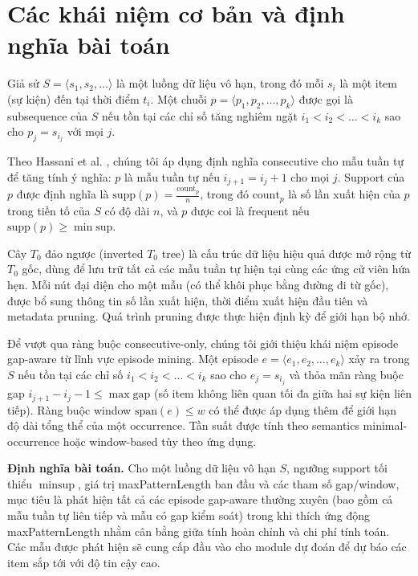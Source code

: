 \documentclass{article}
\begin{document}
\section{Các khái niệm cơ bản và định nghĩa bài toán}
\label{sec:preliminaries}

Giả sử $S = \langle s_1, s_2, \dots \rangle$ là một luồng dữ liệu vô hạn, trong đó mỗi $s_i$ là một item (sự kiện) đến tại thời điểm $t_i$. Một chuỗi $p = \langle p_1, p_2, \dots, p_k \rangle$ được gọi là subsequence của $S$ nếu tồn tại các chỉ số tăng nghiêm ngặt $i_1 < i_2 < \dots < i_k$ sao cho $p_j = s_{i_j}$ với mọi $j$.

Theo Hassani et al. \cite{hassani2019}, chúng tôi áp dụng định nghĩa consecutive cho mẫu tuần tự để tăng tính ý nghĩa: $p$ là mẫu tuần tự nếu $i_{j+1} = i_j + 1$ cho mọi $j$. Support của $p$ được định nghĩa là $\text{supp}(p) = \frac{\text{count}_p}{n}$, trong đó $\text{count}_p$ là số lần xuất hiện của $p$ trong tiền tố của $S$ có độ dài $n$, và $p$ được coi là frequent nếu $\text{supp}(p) \geq \min\text{sup}$.

Cây $T_0$ đảo ngược (inverted $T_0$ tree) là cấu trúc dữ liệu hiệu quả được mở rộng từ $T_0$ gốc, dùng để lưu trữ tất cả các mẫu tuần tự hiện tại cùng các ứng cử viên hứa hẹn. Mỗi nút đại diện cho một mẫu (có thể khôi phục bằng đường đi từ gốc), được bổ sung thông tin số lần xuất hiện, thời điểm xuất hiện đầu tiên và metadata pruning. Quá trình pruning được thực hiện định kỳ để giới hạn bộ nhớ.

Để vượt qua ràng buộc consecutive-only, chúng tôi giới thiệu khái niệm episode gap-aware từ lĩnh vực episode mining. Một episode $e = \langle e_1, e_2, \dots, e_k \rangle$ xảy ra trong $S$ nếu tồn tại các chỉ số $i_1 < i_2 < \dots < i_k$ sao cho $e_j = s_{i_j}$ và thỏa mãn ràng buộc gap $i_{j+1} - i_j - 1 \leq \max\text{gap}$ (số item không liên quan tối đa giữa hai sự kiện liên tiếp). Ràng buộc window $\text{span}(e) \leq w$ có thể được áp dụng thêm để giới hạn độ dài tổng thể của một occurrence. Tần suất được tính theo semantics minimal-occurrence hoặc window-based tùy theo ứng dụng.

\textbf{Định nghĩa bài toán.} Cho một luồng dữ liệu vô hạn $S$, ngưỡng support tối thiểu $\min\text{sup}$, giá trị maxPatternLength ban đầu và các tham số gap/window, mục tiêu là phát hiện tất cả các episode gap-aware thường xuyên (bao gồm cả mẫu tuần tự liên tiếp và mẫu có gap kiểm soát) trong khi thích ứng động maxPatternLength nhằm cân bằng giữa tính hoàn chỉnh và chi phí tính toán. Các mẫu được phát hiện sẽ cung cấp đầu vào cho module dự đoán để dự báo các item sắp tới với độ tin cậy cao.
\end{document}

